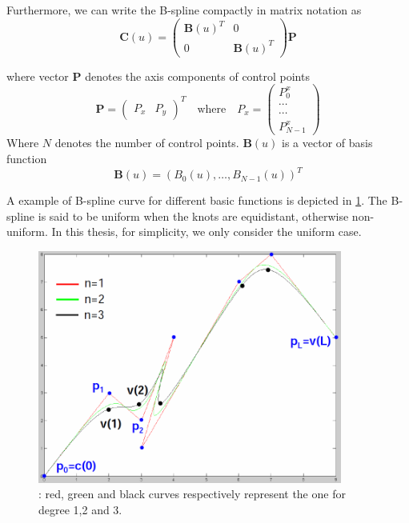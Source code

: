 Furthermore, we can write the B-spline compactly in matrix notation as 
\begin{equation}
  \label{eq:4.3}
  \mathbf{C}(u) = 
  \begin{pmatrix}
\mathbf{B}(u)^T & 0 \\
0 &\mathbf{B}(u)^T
  \end{pmatrix}
\mathbf{P}
\end{equation}

where vector $\mathbf{P}$ denotes the axis components of control
points
\begin{equation}
  \label{eq:4.4}
  \mathbf{P} =
  \begin{pmatrix}
    P_x & P_y    
  \end{pmatrix}^T \quad \mathrm{where} \quad P_x =
  \begin{pmatrix}
    P_0^x\\
    \cdots\\
    \cdots\\
    P_{N-1}^x
  \end{pmatrix}
\end{equation}
Where $N$ denotes the number of control points. $\mathbf{B}(u)$ is a
vector of basis function
\begin{equation}
  \label{eq:4.5}
  \mathbf{B}(u) = (B_0(u), \ldots, B_{N-1}(u))^T
\end{equation}

A example of B-spline curve for different basic functions is depicted
in \ref{fig:bspline}. The B-spline is said to be uniform when the knots are equidistant,
otherwise non-uniform. In this thesis, for simplicity, we only
consider the uniform case.
\begin{figure}[htb]
  \centering
  \includegraphics[width=10cm]{images/bspline.png}
  \caption[B-spline curves for different degrees\cite{contourpanin2011}]{: red, green and black
    curves respectively represent the one for degree 1,2 and 3.}
\label{fig:bspline}
\end{figure}

